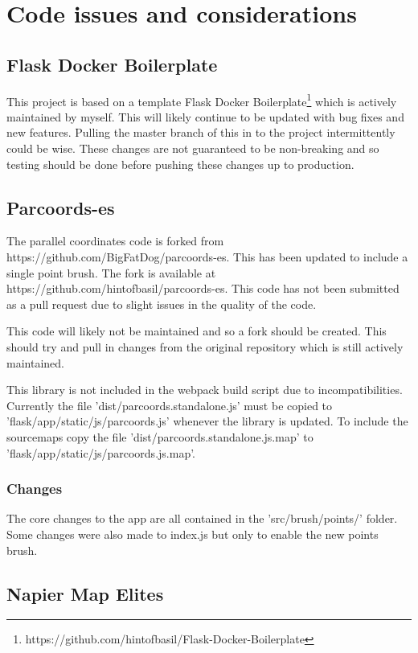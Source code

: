 \section{Code issues and considerations}

\subsection{Flask Docker Boilerplate}

This project is based on a template Flask Docker Boilerplate\footnote{https://github.com/hintofbasil/Flask-Docker-Boilerplate} which is actively maintained by myself.  This will likely continue to be updated with bug fixes and new features.  Pulling the master branch of this in to the project intermittently could be wise.  These changes are not guaranteed to be non-breaking and so testing should be done before pushing these changes up to production.

\subsection{Parcoords-es}

The parallel coordinates code is forked from https://github.com/BigFatDog/parcoords-es.  This has been updated to include a single point brush.  The fork is available at https://github.com/hintofbasil/parcoords-es.  This code has not been submitted as a pull request due to slight issues in the quality of the code.

This code will likely not be maintained and so a fork should be created.  This should try and pull in changes from the original repository which is still actively maintained.

This library is not included in the webpack build script due to incompatibilities.  Currently the file 'dist/parcoords.standalone.js' must be copied to 'flask/app/static/js/parcoords.js' whenever the library is updated.  To include the sourcemaps copy the file 'dist/parcoords.standalone.js.map' to 'flask/app/static/js/parcoords.js.map'.

\subsubsection{Changes}

The core changes to the app are all contained in the 'src/brush/points/' folder.  Some changes were also made to index.js but only to enable the new points brush.

\subsection{Napier Map Elites}

